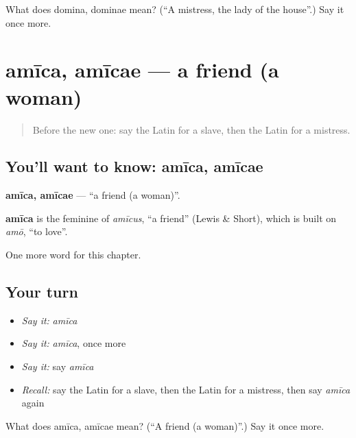\begin{tcolorbox}[breakable,colback=teal!4,colframe=teal!35!black,title={Before you move on}]
What does domina, dominae mean? (\textquotedblleft{}A mistress, the lady of the house\textquotedblright{}.) Say it once more.
\end{tcolorbox}
\section[amīca, amīcae]{amīca, amīcae — a friend (a woman)}

\label{lesson:LA-C138-amica}



\begin{quote}
Before the new one: say the Latin for a slave, then the Latin for a mistress.
\end{quote}

\subsection*{You'll want to know: amīca, amīcae}
\textbf{amīca, amīcae} — \textquotedblleft{}a friend (a woman)\textquotedblright{}.

\begin{cousinweb}
\textbf{amīca} is the feminine of \emph{amīcus}, \textquotedblleft{}a friend\textquotedblright{} (Lewis \& Short), which is built on \emph{amō}, \textquotedblleft{}to love\textquotedblright{}.
\end{cousinweb}

\begin{grammarlens}[title={What you've built}]
One more word for this chapter.
\end{grammarlens}

\subsection*{Your turn}
\begin{itemize}
\raggedright
  \item \emph{Say it:} \emph{amīca}
  \item \emph{Say it:} \emph{amīca}, once more
  \item \emph{Say it:} say \emph{amīca}
  \item \emph{Recall:} say the Latin for a slave, then the Latin for a mistress, then say \emph{amīca} again
\end{itemize}

\begin{tcolorbox}[breakable,colback=teal!4,colframe=teal!35!black,title={Before you move on}]
What does amīca, amīcae mean? (\textquotedblleft{}A friend (a woman)\textquotedblright{}.) Say it once more.
\end{tcolorbox}
